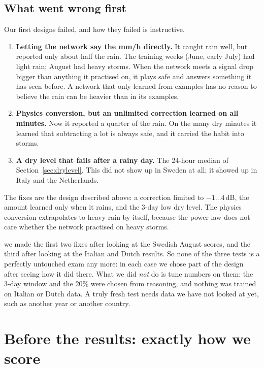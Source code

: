 \subsection{What went wrong first}
Our first designs failed, and how they failed is instructive.
\begin{enumerate}
\item \textbf{Letting the network say the mm/h directly.} It caught rain well, but reported only about half the rain.
The training weeks (June, early July) had light rain; August had heavy storms. When the network meets a signal drop
bigger than anything it practised on, it plays safe and answers something it has seen before. A network that only
learned from examples has no reason to believe the rain can be heavier than in its examples.
\item \textbf{Physics conversion, but an unlimited correction learned on all minutes.} Now it reported a quarter of the
rain. On the many dry minutes it learned that subtracting a lot is always safe, and it carried the habit into storms.
\item \textbf{A dry level that fails after a rainy day.} The 24-hour median of Section~\ref{sec:drylevel}. This did not
show up in Sweden at all; it showed up in Italy and the Netherlands.
\end{enumerate}
The fixes are the design described above: a correction limited to $-1\ldots4$\,dB, the amount learned only when it
rains, and the 3-day low dry level. The physics conversion extrapolates to heavy rain by itself, because the power law
does not care whether the network practised on heavy storms.

\begin{careful}
we made the first two fixes after looking at the Swedish August scores, and the third after looking at the Italian and
Dutch results. So none of the three tests is a perfectly untouched exam any more: in each case we chose part of the
design after seeing how it did there. What we did \emph{not} do is tune numbers on them: the 3-day window and the 20\%
were chosen from reasoning, and nothing was trained on Italian or Dutch data. A truly fresh test needs data we have not
looked at yet, such as another year or another country.
\end{careful}

\section{Before the results: exactly how we score}
\label{sec:scoring_rules}


